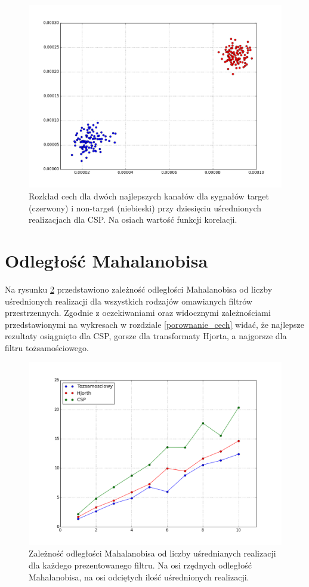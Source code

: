 \documentclass[licencjacka,openright]{pracamgr}
\begin{document}
\begin{figure}
\centering
\includegraphics[scale=0.55, trim=10mm 15mm 10mm 18mm, clip=True]{pics/cecha_csp_10.png}
\caption{Rozkład cech dla dwóch najlepszych kanałów dla sygnałów target (czerwony) i non-target (niebieski) przy dziesięciu uśrednionych realizacjach dla CSP. Na osiach wartość funkcji korelacji.}
\label{cecha_csp_10}
\end{figure}

\section{Odległość Mahalanobisa}
Na rysunku \ref{mahalanobis_pic} przedstawiono zależność odległości Mahalanobisa od liczby uśrednionych realizacji dla wszystkich rodzajów omawianych filtrów przestrzennych. Zgodnie z oczekiwaniami oraz widocznymi zależnościami przedstawionymi na wykresach w rozdziale \ref{porownanie_cech} widać, że najlepsze rezultaty osiągnięto dla CSP, gorsze dla transformaty Hjorta, a najgorsze dla filtru tożsamościowego. 

\begin{figure}
\centering
\includegraphics[scale=0.6, trim=10mm 15mm 10mm 18mm, clip=True]{pics/mahalanobis.png}
\caption{Zależność odległości Mahalanobisa od liczby uśrednianych realizacji dla każdego prezentowanego filtru. Na osi rzędnych odległość Mahalanobisa, na osi odciętych ilość uśrednionych realizacji.}
\label{mahalanobis_pic}
\end{figure}
\end{document}
